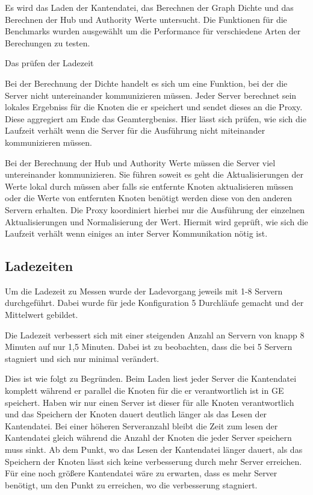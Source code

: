 Es wird das Laden der Kantendatei, das Berechnen der Graph Dichte und das Berechnen der Hub und Authority Werte untersucht. Die Funktionen für die Benchmarks wurden ausgewählt um die Performance für verschiedene Arten der Berechungen zu testen.

Das prüfen der Ladezeit 

Bei der Berechnung der Dichte handelt es sich um eine Funktion, bei der die Server nicht untereinander kommunizieren müssen. Jeder Server berechnet sein lokales Ergebniss für die Knoten die er speichert und sendet dieses an die Proxy. 
Diese aggregiert am Ende das Geamtergbeniss. Hier lässt sich prüfen, wie sich die Laufzeit verhält wenn die Server für die Ausführung nicht miteinander kommunizieren müssen.

Bei der Berechnung der Hub und Authority Werte müssen die Server viel untereinander kommunizieren. Sie führen soweit es geht die Aktualisierungen der Werte lokal durch müssen aber falls sie entfernte Knoten aktualisieren müssen oder die Werte von entfernten Knoten benötigt werden diese von den anderen Servern erhalten.
Die Proxy koordiniert hierbei nur die Ausführung der einzelnen Aktualisierungen und Normalisierung der Wert. Hiermit wird geprüft, wie sich die Laufzeit verhält wenn einiges an inter Server Kommunikation nötig ist.


\subsection{Ladezeiten}

Um die Ladezeit zu Messen wurde der Ladevorgang jeweils mit 1-8 Servern durchgeführt. Dabei wurde für jede Konfiguration 5 Durchläufe gemacht und der Mittelwert gebildet.

Die Ladezeit verbessert sich mit einer steigenden Anzahl an Servern von knapp 8 Minuten auf nur 1,5 Minuten. Dabei ist zu beobachten, dass die bei 5 Servern stagniert und sich nur minimal verändert.

Dies ist wie folgt zu Begründen. Beim Laden liest jeder Server die Kantendatei komplett während er parallel die Knoten für die er verantwortlich ist in GE speichert. Haben wir nur einen Server ist dieser für alle Knoten verantwortlich
und das Speichern der Knoten dauert deutlich länger als das Lesen der Kantendatei. Bei einer höheren Serveranzahl bleibt die Zeit zum lesen der Kantendatei gleich während die Anzahl der Knoten die jeder Server speichern muss sinkt.
Ab dem Punkt, wo das Lesen der Kantendatei länger dauert, als das Speichern der Knoten lässt sich keine verbesserung durch mehr Server erreichen. Für eine noch größere Kantendatei wäre zu erwarten, dass es mehr Server benötigt, um den Punkt zu erreichen, wo die verbesserung stagniert.

